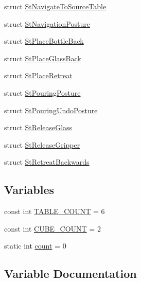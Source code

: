 \begin{DoxyCompactItemize}
\item 
struct \hyperlink{structsm__moveit__wine__serve_1_1StNavigateToSourceTable}{St\+Navigate\+To\+Source\+Table}
\item 
struct \hyperlink{structsm__moveit__wine__serve_1_1StNavigationPosture}{St\+Navigation\+Posture}
\item 
struct \hyperlink{structsm__moveit__wine__serve_1_1StPlaceBottleBack}{St\+Place\+Bottle\+Back}
\item 
struct \hyperlink{structsm__moveit__wine__serve_1_1StPlaceGlassBack}{St\+Place\+Glass\+Back}
\item 
struct \hyperlink{structsm__moveit__wine__serve_1_1StPlaceRetreat}{St\+Place\+Retreat}
\item 
struct \hyperlink{structsm__moveit__wine__serve_1_1StPouringPosture}{St\+Pouring\+Posture}
\item 
struct \hyperlink{structsm__moveit__wine__serve_1_1StPouringUndoPosture}{St\+Pouring\+Undo\+Posture}
\item 
struct \hyperlink{structsm__moveit__wine__serve_1_1StReleaseGlass}{St\+Release\+Glass}
\item 
struct \hyperlink{structsm__moveit__wine__serve_1_1StReleaseGripper}{St\+Release\+Gripper}
\item 
struct \hyperlink{structsm__moveit__wine__serve_1_1StRetreatBackwards}{St\+Retreat\+Backwards}
\end{DoxyCompactItemize}
\subsection*{Variables}
\begin{DoxyCompactItemize}
\item 
const int \hyperlink{namespacesm__moveit__wine__serve_adaca9c235c0d76019ef6ff08dd32977c}{T\+A\+B\+L\+E\+\_\+\+C\+O\+U\+NT} = 6
\item 
const int \hyperlink{namespacesm__moveit__wine__serve_ac6a021cad03473894d9b5adfd589f49b}{C\+U\+B\+E\+\_\+\+C\+O\+U\+NT} = 2
\item 
static int \hyperlink{namespacesm__moveit__wine__serve_a063862eb9f05d24ee2307749a218fb17}{count} = 0
\end{DoxyCompactItemize}


\subsection{Variable Documentation}
\mbox{\label{namespacesm__moveit__wine__serve_a063862eb9f05d24ee2307749a218fb17}} 
